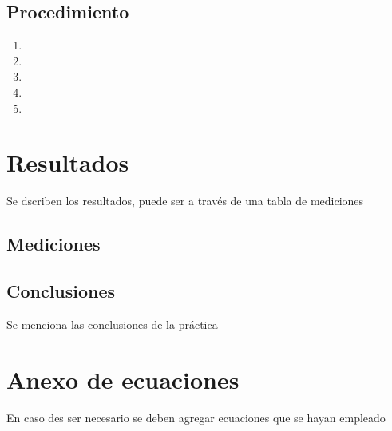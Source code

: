 \documentclass[letterpaper,12pt]{extarticle}%
\begin{document}
\begin{multicols}{2}
	\subsection{Procedimiento}
	\renewcommand{\labelenumi}{\arabic{enumi}.}
	\begin{enumerate}
		\item 
		
		\item 
		
		\item
		
		\item
		
		\item
		
	\end{enumerate}
    \end{multicols}
    
    	
    \section{Resultados}
    Se dscriben los resultados, puede ser a través de una tabla de mediciones
	\subsection{Mediciones}

	\begin{multicols}{2}
	    
	    \section{Conclusiones}

Se menciona las conclusiones de la práctica	    
%            
    \end{multicols}
    
	\newpage
	
	\section{Anexo de ecuaciones}
	
	En caso des ser necesario se deben agregar ecuaciones que se hayan empleado
	\cfoot{\LaTeX}
\end{document}
